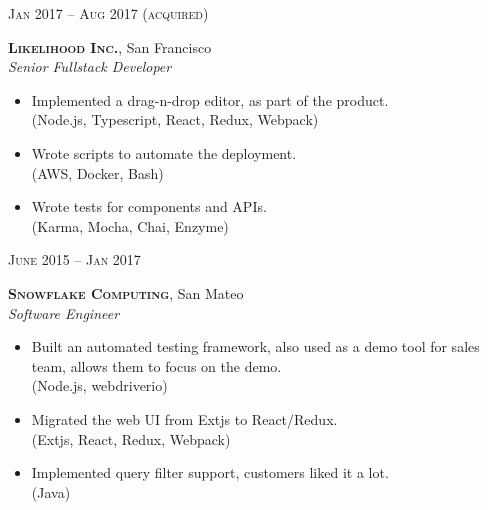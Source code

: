 \documentclass[10pt]{article}
\begin{document}
{\begin{minipage}[t]{0.5\textwidth}

{\raggedleft\textsc{Jan 2017 -- Aug 2017  {\color{Mahogany}(acquired)}}\par}

{\raggedright\large \textbf{\textsc{Likelihood Inc.}}, San Francisco\\
\textit{Senior Fullstack Developer}\\[5pt]}

\begin{itemize}
	\item Implemented a drag-n-drop editor, as part of the product. \\
	{\color{Mahogany}(Node.js, Typescript, React, Redux, Webpack)}
	\item Wrote scripts to automate the deployment. \\
	{\color{Mahogany}(AWS, Docker, Bash)}
	\item Wrote tests for components and APIs. \\
	{\color{Mahogany}(Karma, Mocha, Chai, Enzyme)}
\end{itemize}

{\raggedleft\textsc{June 2015 -- Jan 2017}\par}

{\raggedright\large \textbf{\textsc{Snowflake Computing}}, San Mateo\\
\textit{Software Engineer}\\[5pt]}

\begin{itemize}
	\item Built an automated testing framework, also used as a demo tool for sales team, allows them to focus on the demo. \\
	{\color{Mahogany}(Node.js, webdriverio)}
	\item Migrated the web UI from Extjs to React/Redux. \\
	{\color{Mahogany}(Extjs, React, Redux, Webpack)}
	\item Implemented query filter support, customers liked it a lot. \\
	{\color{Mahogany}(Java)}
\end{itemize}



\end{minipage}}
\end{document}
